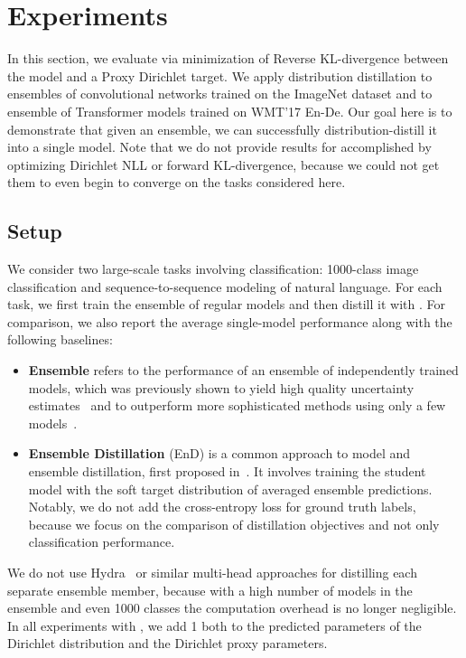 \section{Experiments}
\label{sec:experiments}

In this section, we evaluate \Endd via minimization of Reverse KL-divergence between the model and a Proxy Dirichlet target. We apply distribution distillation to ensembles of convolutional networks trained on the ImageNet dataset and to ensemble of Transformer models trained on WMT'17 En-De. Our goal here is to demonstrate that given an ensemble, we can successfully distribution-distill it into a single model. Note that we do not provide results for \Endd accomplished by optimizing Dirichlet NLL or forward KL-divergence, because we could not get them to even begin to converge on the tasks considered here. 

\subsection{Setup}
\label{sec:experiments_setup}
We consider two large-scale tasks involving classification: 1000-class image classification and sequence-to-sequence modeling of natural language. For each task, we first train the ensemble of regular models and then distill it with \Endd. For comparison, we also report the average single-model performance along with the following baselines:

\begin{itemize}
\item \textbf{Ensemble} refers to the performance of an ensemble of independently trained models, which was previously shown to yield high quality uncertainty estimates~\cite{deepensemble2017} and to outperform more sophisticated methods using only a few models~\cite{ashukha2020pitfalls}.
\item \textbf{Ensemble Distillation} (EnD) is a common approach to model and ensemble distillation, first proposed in~\cite{hinton2015distilling}. It involves training the student model with the soft target distribution of averaged ensemble predictions. Notably, we do not add the cross-entropy loss for ground truth labels, because we focus on the comparison of distillation objectives and not only classification performance.
\end{itemize}

We do not use Hydra~\cite{hydra} or similar multi-head approaches for distilling each separate ensemble member, because with a high number of models in the ensemble and even 1000 classes the computation overhead is no longer negligible. In all experiments with \Endd, we add 1 both to the predicted parameters of the Dirichlet distribution and the Dirichlet proxy parameters.

